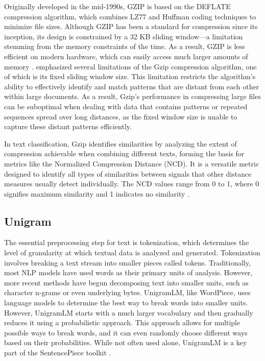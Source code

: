 Originally developed in the mid-1990s, GZIP is based on the DEFLATE compression algorithm, which combines LZ77 and Huffman coding techniques to minimize file sizes. Although GZIP has been a standard for compression since its inception, its design is constrained by a 32 KB sliding window—a limitation stemming from the memory constraints of the time. As a result, GZIP is less efficient on modern hardware, which can easily access much larger amounts of memory \cite{Bullock2024}. \cite{Jiang2022} emphasized several limitations of the Gzip compression algorithm, one of which is its fixed sliding window size. This limitation restricts the algorithm's ability to effectively identify and match patterns that are distant from each other within large documents. As a result, Gzip's performance in compressing large files can be suboptimal when dealing with data that contains patterns or repeated sequences spread over long distances, as the fixed window size is unable to capture these distant patterns efficiently.

In text classification, Gzip identifies similarities by analyzing the extent of compression achievable when combining different texts, forming the basis for metrics like the Normalized Compression Distance (NCD). It is a versatile metric designed to identify all types of similarities between signals that other distance measures usually detect individually. The NCD values range from 0 to 1, where 0 signifies maximum similarity and 1 indicates no similarity \cite{Pascarella2022}.

\subsection{Unigram}

The essential preprocessing step for text is tokenization, which determines the level of granularity at which textual data is analyzed and generated. Tokenization involves breaking a text stream into smaller pieces called tokens. Traditionally, most NLP models have used words as their primary units of analysis. However, more recent methods have begun decomposing text into smaller units, such as character n-grams or even underlying bytes. UnigramLM, like WordPiece, uses language models to determine the best way to break words into smaller units. However, UnigramLM starts with a much larger vocabulary and then gradually reduces it using a probabilistic approach. This approach allows for multiple possible ways to break words, and it can even randomly choose different ways based on their probabilities. While not often used alone, UnigramLM is a key part of the SentencePiece toolkit \cite{Gasparetto2022}. 

